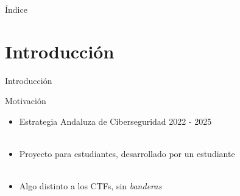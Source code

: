 \begin{frame}
    \titlepage
\end{frame}

\begin{frame}{Índice}
    \tableofcontents
\end{frame}


\section{Introducción}

    \begin{frame}
        \Huge{\centerline{Introducción}}
    \end{frame}

    \begin{frame}{Motivación}
        \begin{itemize}
            \item Estrategia Andaluza de Ciberseguridad 2022 - 2025
            \\~\\
            \item Proyecto para estudiantes, desarrollado por un estudiante
            \\~\\
            \item Algo distinto a los CTFs, sin \textit{banderas}
        \end{itemize}
    \end{frame}

